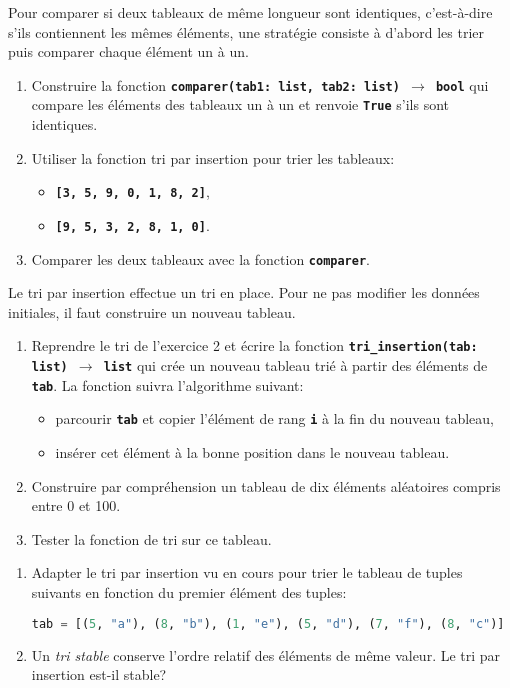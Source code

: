 \documentclass[a4paper,11pt]{article}
\begin{document}
\begin{exo}
Pour comparer si deux tableaux de même longueur sont identiques, c’est-à-dire s'ils contiennent les mêmes éléments, une stratégie consiste à d'abord les trier puis comparer chaque élément un à un.
\begin{enumerate}
    \item Construire la fonction \textbf{\texttt{comparer(tab1: list, tab2: list) $\rightarrow$ bool}} qui compare les éléments des tableaux un à un et renvoie \textbf{\texttt{True}} s'ils sont identiques.
    \item Utiliser la fonction tri par insertion pour trier les tableaux:
    \begin{itemize}
        \item \textbf{\texttt{[3, 5, 9, 0, 1, 8, 2]}},
        \item \textbf{\texttt{[9, 5, 3, 2, 8, 1, 0]}}.
    \end{itemize}
    \item Comparer les deux tableaux avec la fonction \textbf{\texttt{comparer}}.
\end{enumerate}

\end{exo}
\begin{exo}
Le tri par insertion effectue un tri en place. Pour ne pas modifier les données initiales, il faut construire un nouveau tableau.
\begin{enumerate}
    \item Reprendre le tri de l'exercice 2 et écrire la fonction \textbf{\texttt{tri\_insertion(tab: list) $\rightarrow$ list}} qui crée un nouveau tableau trié à partir des éléments de \textbf{\texttt{tab}}. La fonction suivra l'algorithme suivant:
    \begin{itemize}
        \item parcourir \textbf{\texttt{tab}} et copier l'élément de rang \textbf{\texttt{i}} à la fin du nouveau tableau,
        \item insérer cet élément à la bonne position dans le nouveau tableau.
    \end{itemize} 
    \item Construire par compréhension un tableau de dix éléments aléatoires compris entre 0 et 100.
    \item Tester la fonction de tri sur ce tableau.
\end{enumerate}
\end{exo}
\begin{exo}
\begin{enumerate}
    \item Adapter le tri par insertion vu en cours pour trier le tableau de tuples suivants en fonction du premier élément des tuples:
    \begin{lstlisting}[language=Python, basicstyle=\ttfamily\small, xleftmargin=2em, xrightmargin=2em]
tab = [(5, "a"), (8, "b"), (1, "e"), (5, "d"), (7, "f"), (8, "c")]
\end{lstlisting}
    \item Un \emph{tri stable} conserve l'ordre relatif des éléments de même valeur. Le tri par insertion est-il stable?
\end{enumerate}
\end{exo}
\end{document}
